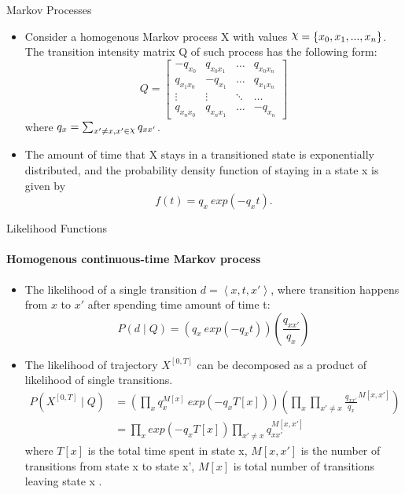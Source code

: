\documentclass[
	english,%
	aspectratio=169,%
	color={accentcolor=3b},
	logo=true,%
	colorframetitle=false,%
	]{tudabeamer}
\DeclareRobustCommand{\rchi}{{\mathpalette\irchi\relax}}
\newcommand{\irchi}[2]{\raisebox{\depth}{$#1\chi$}}
\begin{document}
\begin{frame}{Markov Processes}
\begin{itemize}
\item Consider a homogenous Markov process X with values $ \rchi = \left\lbrace x_{0}, x_{1},..., x_{n}\right\rbrace  $. The transition intensity matrix Q of such process has the following form:
\begin{equation}
Q = 
\begin{bmatrix}
-q_{x_{0}} & q_{x_{0}x_{1}} & 	{\hdots}  & q_{x_{0}x_{n}} \\
q_{x_{1}x_{0}} & -q_{x_{1}} & 	{\hdots}  & q_{x_{1}x_{n}}  \\
{\vdots}  & 	{\vdots}  & 	{\ddots}  & {\hdots}  \\
q_{x_{n}x_{0}} &  q_{x_{n}x_{1}} &  {\hdots} & -q_{x_{n}}
\end{bmatrix}
\end{equation}
where $ q_{x} = \sum_{x' \neq x, x' \in \rchi} q_{xx'}$.
\item The amount of time that X stays in a transitioned state is exponentially distributed, and the probability density function of staying in a state x is given by \cite{Nodelman1995}
\begin{equation}
f(t) = q_{x}\ exp(-q_{x}t).
\end{equation}
\end{itemize}
\end{frame}


\begin{frame}{Likelihood Functions}
\framesubtitle{Homogenous continuous-time Markov process}
\fontsize{9pt}{6}\selectfont
\begin{itemize}
\item The likelihood of a single transition $ d = \left\langle x,t,x'\right\rangle $, where transition happens from $x$ to $x'$ after spending time amount of time t:
\begin{equation}
P(d  \mid Q) = \left( q_{x}\ exp(-q_{x}t) \right) \left( \frac{q_{xx'}}{q_{x}} \right)
\end{equation}
\item The likelihood of trajectory $X^{[0,T]}$ can be decomposed as a product of likelihood of single transitions.
\begin{align}
P(X^{[0,T]}  \mid Q) & = \left( \prod_{x}  q_{x}^{M[x]}\ exp(-q_{x}T[x]) \right) \left( \prod_{x} \prod_{x' \neq x}  \frac{q_{xx'}}{q_{x}}^{M[x,x']} \right) \nonumber\\ & = \prod_{x}  exp(-q_{x}T[x]) \prod_{x' \neq x}  q_{xx'}^{M[x,x']}
\label{homo_llh}
\end{align}
where $ T[x] $ is the total time spent in state x, $ M[x,x'] $ is the number of transitions from state x to state x', $ M[x] $ is total number of transitions leaving state x \cite{Nodelman2003}.
\end{itemize}
\end{frame}
\end{document}
